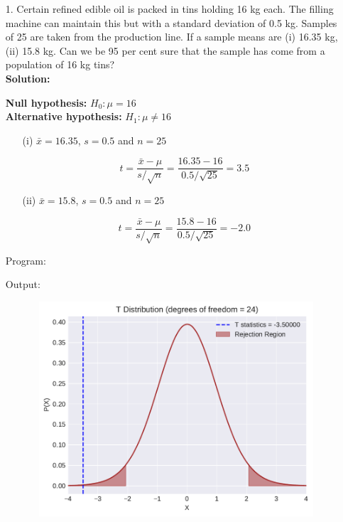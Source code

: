 \documentclass[a4paper,11pt,openright]{report}
\begin{document}
\begin{enumerate}

\item[1.] Certain refined edible oil is packed in tins holding 16 kg each. The filling
machine can maintain this but with a standard deviation of 0.5 kg. Samples of 25 are taken
from the production line. If a sample means are (i) 16.35 kg, (ii) 15.8 kg. Can we be 95 per
cent sure that the sample has come from a population of 16 kg tins? \\

\textbf{Solution:}

\textbf{Null hypothesis:} $H_{0}: \mu = 16$ \\
\textbf{Alternative hypothesis:} $H_{1}: \mu \neq 16$ 

\begin{enumerate}
\item[(i)] $\bar x = 16.35$, $s = 0.5$ and $n = 25$ 

\begin{equation*}
t = \frac{\bar x - \mu}{s/\sqrt{n}}
  = \frac{16.35 - 16}{0.5/\sqrt{25}} 
  = 3.5
\end{equation*}

\item[(ii)] $\bar x = 15.8$, $s = 0.5$ and $n = 25$

\begin{equation*}
t = \frac{\bar x - \mu}{s/\sqrt{n}}
  = \frac{15.8 - 16}{0.5/\sqrt{25}}
  = -2.0
\end{equation*}	

\end{enumerate}

\vspace{1cm}

Program:


\vspace{1cm}

Output:


\begin{figure}[ht!]
\includegraphics[width=16cm,height=8cm,keepaspectratio]{tscript1a.pdf}
\centering
\end{figure}


\end{enumerate}
\end{document}
